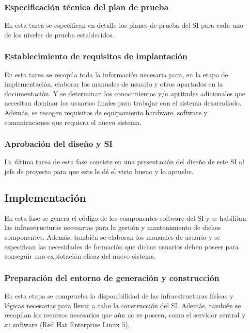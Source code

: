 \documentclass[11pt,a4paper,spanish,twoside]{book}
\begin{document}
\subsubsection{Especificación técnica del plan de prueba}
En esta tarea se especifican en detalle los planes de prueba del SI para cada 
uno de los niveles de prueba establecidos.

\subsubsection{Establecimiento de requisitos de implantación}
En esta tarea se recopila toda la información necesaria para, en la etapa de 
implementación, elaborar los manuales de usuario y otros apartados en la 
documentación. Y se determinan los conocimientos y/o aptitudes adicionales que 
necesitan dominar los usuarios finales para trabajar con el sistema 
desarrollado. Además, se recogen requisitos de equipamiento hardware, software 
y comunicaciones que requiera el nuevo sistema.

\subsubsection{Aprobación del diseño y SI}
La última tarea de esta fase consiste en una presentación del diseño de este SI
al jefe de proyecto para que este le dé el visto bueno y lo apruebe.

\subsection{Implementación}
En esta fase se genera el código de los componentes software del SI y se 
habilitan las infraestructuras necesarias para la gestión y mantenimiento de 
dichos componentes. Además, también se elaboran los manuales de usuario y se 
especifican las necesidades de formación que dichos usuarios deben poseer 
para conseguir una explotación eficaz del nuevo sistema.

\subsubsection{Preparación del entorno de generación y construcción}
En esta etapa se comprueba la disponibilidad de las infraestructuras físicas 
y lógicas necesarias para llevar a cabo la construcción del SI. Además, también
se recopilan los recursos necesarios que aún no se poseen, como el servidor 
central y su software (Red Hat Enterprise Linux 5).
\end{document}
